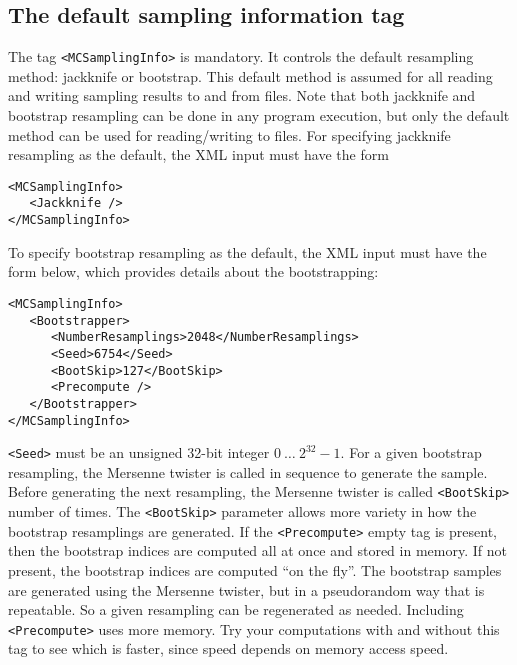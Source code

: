 \documentclass[12pt]{article}
\newcommand{\vb}{\texttt}
\begin{document}
\subsection{The default sampling information tag}
The tag \vb{<MCSamplingInfo>} is mandatory.  It controls the default
resampling method:  jackknife or bootstrap.  This default method
is assumed for all reading and writing sampling results to and
from files.  Note that both jackknife and bootstrap resampling
can be done in any program execution, but only the default method can be used
for reading/writing to files.  For specifying jackknife resampling as
the default, the XML input must have the form
\begin{verbatim}
<MCSamplingInfo>
   <Jackknife />
</MCSamplingInfo>
\end{verbatim}
To specify bootstrap resampling as the default, the XML input must have the
form below, which provides details about the bootstrapping:
\begin{verbatim}
<MCSamplingInfo>
   <Bootstrapper>
      <NumberResamplings>2048</NumberResamplings>
      <Seed>6754</Seed>
      <BootSkip>127</BootSkip>
      <Precompute />
   </Bootstrapper>
</MCSamplingInfo>
\end{verbatim}
\vb{<Seed>} must be an unsigned 32-bit integer $0\ \dots\ 2^{32}-1$.
For a given bootstrap resampling, the Mersenne twister is
called in sequence to generate the sample. Before generating
the next resampling, the Mersenne twister is called \vb{<BootSkip>}
number of times. The \vb{<BootSkip>} parameter allows more variety
in how the bootstrap resamplings are generated. If the \vb{<Precompute>}
empty tag is present, then the bootstrap indices are computed all at once
and stored in memory. If not present, the bootstrap indices are computed
``on the fly''. The bootstrap samples are generated using the Mersenne
twister, but in a pseudorandom way that is repeatable. So a given resampling
can be regenerated as needed. Including \vb{<Precompute>} uses more memory.
Try your computations with and without this tag to see which is faster,
since speed depends on memory access speed.
\end{document}

